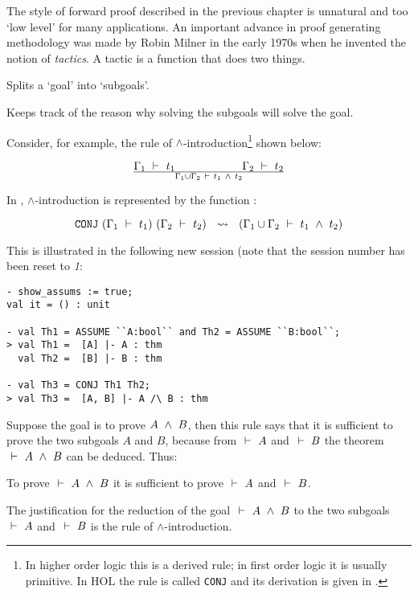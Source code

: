The style of forward proof described in the previous chapter is
unnatural and too `low level' for many applications. An important
advance in proof generating methodology was made by Robin Milner in
the early 1970s when he invented the notion of {\it tactics\/}. A
tactic is a function that does two things.
\begin{myenumerate}
\item Splits a `goal' into `subgoals'.
\item Keeps track of the reason why solving the subgoals will solve the goal.
\end{myenumerate}

\noindent Consider, for example, the  rule of $\wedge$-introduction\footnote{In
  higher order logic this is a derived rule; in first order logic it
  is usually primitive.  In HOL the rule is called {\tt CONJ} and its
  derivation is given in \DESCRIPTION.}  shown below:

\[ \Gamma_1\ \vdash\ 
t_1\qquad\qquad\qquad\Gamma_2\ \vdash\  t_2\over \Gamma_1\cup\Gamma_2 \ \vdash\  t_1\ \wedge\ 
t_2 \]


\noindent In \HOL,  $\wedge$-introduction is  represented by  the \ML{} function
:

\[\ml{CONJ}\ (\Gamma_1\turn t_1)\ (\Gamma_2\turn t_2) \ \ \leadsto\
\ (\Gamma_1\cup\Gamma_2\turn  t_1\conj  t_2)\]

\noindent  This  is   illustrated  in  the
following new session (note that the session number has been reset to
{\small\sl 1}:

\setcounter{sessioncount}{0}
\begin{session}\begin{verbatim}
- show_assums := true;
val it = () : unit

- val Th1 = ASSUME ``A:bool`` and Th2 = ASSUME ``B:bool``;
> val Th1 =  [A] |- A : thm
  val Th2 =  [B] |- B : thm

- val Th3 = CONJ Th1 Th2;
> val Th3 =  [A, B] |- A /\ B : thm
\end{verbatim}\end{session}

    Suppose the goal is to prove $A\ \wedge\  B$, then this rule says that
    it is sufficient to prove the two subgoals $A$ and $B$, because
    from $\ \vdash\  A$ and $\ \vdash\  B$ the theorem $\ \vdash\  A\ \wedge\  B$ can be
    deduced. Thus:

\begin{myenumerate}
\item To prove $\ \vdash\  A \ \wedge\  B$ it is sufficient to
      prove $\ \vdash\  A$ and $\ \vdash\  B$.
\item The justification for the reduction of the
goal  $\ \vdash\  A \ \wedge\  B$  to the two  subgoals  $\ \vdash\  A$
and $\ \vdash\  B$ is the rule of $\wedge$-introduction.
\end{myenumerate}

